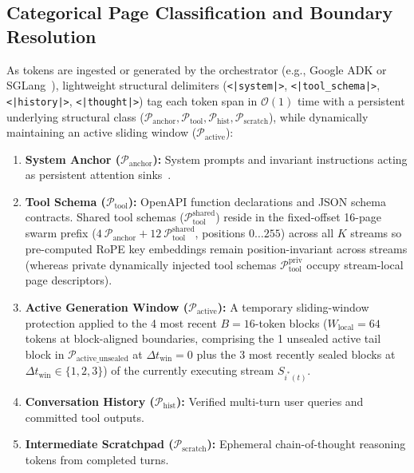 \documentclass[conference,10pt]{IEEEtran}
\begin{document}
\subsection{Categorical Page Classification and Boundary Resolution}
As tokens are ingested or generated by the orchestrator (e.g., Google ADK or SGLang~\cite{zheng2024sglang}), lightweight structural delimiters (\texttt{<|system|>}, \texttt{<|tool\_schema|>}, \texttt{<|history|>}, \texttt{<|thought|>}) tag each token span in $\mathcal{O}(1)$ time with a persistent underlying structural class ($\mathcal{P}_{\text{anchor}}, \mathcal{P}_{\text{tool}}, \mathcal{P}_{\text{hist}}, \mathcal{P}_{\text{scratch}}$), while dynamically maintaining an active sliding window ($\mathcal{P}_{\text{active}}$):
\begin{enumerate}
    \item \textbf{System Anchor ($\mathcal{P}_{\text{anchor}}$):} System prompts and invariant instructions acting as persistent attention sinks~\cite{xiao2023efficient}.
    \item \textbf{Tool Schema ($\mathcal{P}_{\text{tool}}$):} OpenAPI function declarations and JSON schema contracts. Shared tool schemas ($\mathcal{P}_{\text{tool}}^{\text{shared}}$) reside in the fixed-offset 16-page swarm prefix ($4\ \mathcal{P}_{\text{anchor}} + 12\ \mathcal{P}_{\text{tool}}^{\text{shared}}$, positions $0\dots 255$) across all $K$ streams so pre-computed RoPE key embeddings remain position-invariant across streams (whereas private dynamically injected tool schemas $\mathcal{P}_{\text{tool}}^{\text{priv}}$ occupy stream-local page descriptors).
    \item \textbf{Active Generation Window ($\mathcal{P}_{\text{active}}$):} A temporary sliding-window protection applied to the 4 most recent $B=16$-token blocks ($W_{\text{local}} = 64$ tokens at block-aligned boundaries, comprising the 1 unsealed active tail block in $\mathcal{P}_{\text{active\_unsealed}}$ at $\Delta t_{\text{win}}=0$ plus the 3 most recently sealed blocks at $\Delta t_{\text{win}} \in \{1, 2, 3\}$) of the currently executing stream $S_{i^*(t)}$.
    \item \textbf{Conversation History ($\mathcal{P}_{\text{hist}}$):} Verified multi-turn user queries and committed tool outputs.
    \item \textbf{Intermediate Scratchpad ($\mathcal{P}_{\text{scratch}}$):} Ephemeral chain-of-thought reasoning tokens from completed turns.
\end{enumerate}
\end{document}
